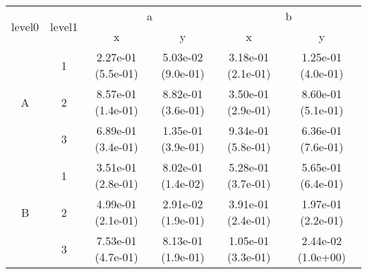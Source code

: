 \begin{tabular}{cccccc}
\toprule
\multirow{2}{*}{level0} & \multirow{2}{*}{level1}&\multicolumn{2}{c}{a}&\multicolumn{2}{c}{b}\tabularnewline
\cmidrule(lr){3-4}
\cmidrule(lr){5-6}
&&x&y&x&y\tabularnewline
\midrule
\multirow{3}{*}{A}&1& 2.27e-01 (5.5e-01)& 5.03e-02 (9.0e-01)& 3.18e-01 (2.1e-01)& 1.25e-01 (4.0e-01)\tabularnewline
&2& 8.57e-01 (1.4e-01)& 8.82e-01 (3.6e-01)& 3.50e-01 (2.9e-01)& 8.60e-01 (5.1e-01)\tabularnewline
&3& 6.89e-01 (3.4e-01)& 1.35e-01 (3.9e-01)& 9.34e-01 (5.8e-01)& 6.36e-01 (7.6e-01)\tabularnewline
\midrule
\multirow{3}{*}{B}&1& 3.51e-01 (2.8e-01)& 8.02e-01 (1.4e-02)& 5.28e-01 (3.7e-01)& 5.65e-01 (6.4e-01)\tabularnewline
&2& 4.99e-01 (2.1e-01)& 2.91e-02 (1.9e-01)& 3.91e-01 (2.4e-01)& 1.97e-01 (2.2e-01)\tabularnewline
&3& 7.53e-01 (4.7e-01)& 8.13e-01 (1.9e-01)& 1.05e-01 (3.3e-01)& 2.44e-02 (1.0e+00)\tabularnewline
\bottomrule
\end{tabular}
